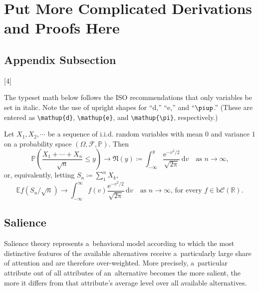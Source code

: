 


\section{Put More Complicated Derivations and Proofs Here}
\label{sec:app:derivations}

\subsection{Appendix Subsection}
\label{sec:app:derivations:one}

\blindmathtrue
\Blindtext[1]

[4]

\def\Pr{\ensuremath{\mathbb{P}}}
\def\rmd{\mathup{d}}
The typeset math below follows the ISO recommendations that only variables be set in italic. Note the use of upright shapes for ``$\rmd$,'' ``$\mathup{e}$,'' and ``$\piup$.'' (These are entered as \texttt{\textbackslash mathup\{d\}}, \texttt{\textbackslash mathup\{e\}}, and \texttt{\textbackslash mathup\{\textbackslash pi\}}, respectively.)

\begin{theorem}
	Let $X_1, X_2, \cdots$ be a sequence of i.i.d. random variables with mean $0$ 
	and variance $1$ on a probability space $(\Omega,\mathcal{F},\Pr)$. Then
	\[\Pr\left(\frac{X_1+\cdots+X_n}{\sqrt{n}}\le y\right)\to\mathfrak{N}(y) \coloneqq 
	\int_{-\infty}^y \frac{\mathup{e}^{-v^2/2}}{\sqrt{2\mathup{\pi}}}\,
	\mathup{d}v\quad\mbox{as $n\to\infty$,}\]
	or, equivalently, letting $S_n \coloneqq \sum_1^n X_k$,
	\[\mathbb{E} f\left(S_n/\sqrt{n}\right)\to \int_{-\infty}^\infty f(v)
	\frac{\mathup{e}^{-v^2/2}}{\sqrt{2\mathup{\pi}}}\,\mathup{d}v
	\quad\mbox{as $n\to\infty$, for every $f\in\mathup{b}
	\mathcal{C}(\mathbb{R})$.}\]
\end{theorem}

\subsection{Salience}
\label{sec:app:salience}

Salience theory \citep{Bordalo2012, Bordalo2013} represents a~behavioral model according to which the most distinctive features of the available alternatives receive a~particularly large share of attention and are therefore over-weighted. More precisely, a~particular attribute out of all attributes of an~alternative becomes the more salient, the more it differs from that attribute's average level over all available alternatives.

